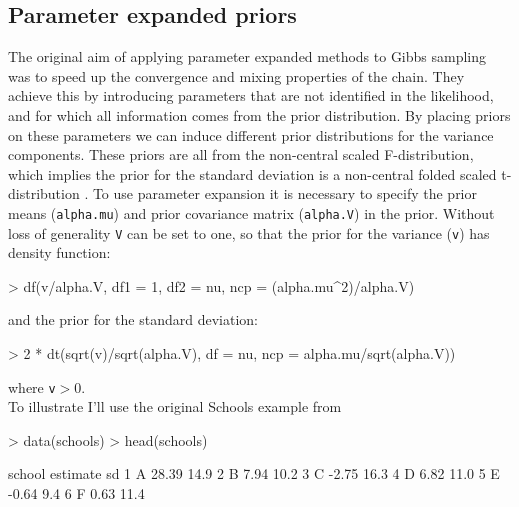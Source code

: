 \documentclass{article}
\begin{document}
\subsection{Parameter expanded priors}
\label{secPX-p}

The original aim of applying parameter expanded methods to Gibbs sampling was to speed up the convergence and mixing properties of the chain. They achieve this by introducing parameters that are not identified in the likelihood, and for which all information comes from the prior distribution. By placing priors on these parameters we can induce different prior distributions for the variance components. These priors are all from the non-central scaled F-distribution, which implies the prior for the standard deviation is a non-central folded scaled t-distribution \citep{Gelman.2006}. To use parameter expansion it is necessary to specify the prior means (\texttt{alpha.mu}) and prior covariance matrix (\texttt{alpha.V}) in the prior. Without loss of generality \texttt{V} can be set to one, so that the prior for the variance (\texttt{v}) has density function:


\begin{Schunk}
\begin{Sinput}
> df(v/alpha.V, df1 = 1, df2 = nu, ncp = (alpha.mu^2)/alpha.V)
\end{Sinput}
\end{Schunk}

and the prior for the standard deviation:

\begin{Schunk}
\begin{Sinput}
> 2 * dt(sqrt(v)/sqrt(alpha.V), df = nu, ncp = alpha.mu/sqrt(alpha.V))
\end{Sinput}
\end{Schunk}

where \texttt{v}$>0$.\\

To illustrate I'll use the original Schools example from \citep{Gelman.2005}

\begin{Schunk}
\begin{Sinput}
> data(schools)
> head(schools)
\end{Sinput}
\begin{Soutput}
  school estimate   sd
1      A    28.39 14.9
2      B     7.94 10.2
3      C    -2.75 16.3
4      D     6.82 11.0
5      E    -0.64  9.4
6      F     0.63 11.4
\end{Soutput}
\end{Schunk}
\end{document}
